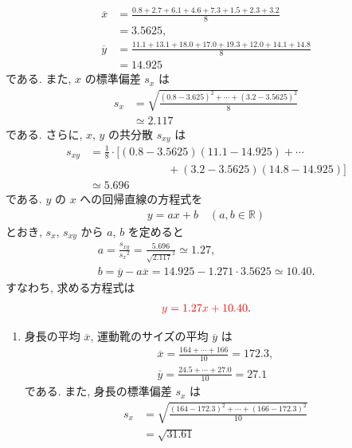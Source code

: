 \begin{qenumerate}
{\begin{align}
			\overline{x} &= \frac{0.8 + 2.7 + 6.1 + 4.6 + 7.3 + 1.5 + 2.3 + 3.2}{8} \\
				&= 3.5625, \\
			\overline{y} &= \frac{11.1 \! + \! 13.1 \! + \! 18.0 \! + \! 17.0 \! + \! 19.3 \! + \! 12.0 \! + \! 14.1 \! + \! 14.8}{8} \\
				&= 14.925
		\end{align}
		である.
		また, $x$ の標準偏差 $s_{x}$ は
		\begin{align}
			s_{x} &= \sqrt{\frac{(0.8 - 3.625)^{2} + \cdots + (3.2 - 3.5625)^{2}}{8}} \\
				&\simeq 2.117
		\end{align}
		である.
		さらに, $x$, $y$ の共分散 $s_{xy}$ は
		\begin{align}
			s_{xy} &= \frac{1}{8}\cdot [(0.8 - 3.5625)(11.1 - 14.925) + \cdots \\
				&\quad\quad\quad\quad\quad\quad\quad + (3.2 - 3.5625)(14.8 - 14.925)] \\
				&\simeq 5.696
		\end{align}
		である.
		$y$ の $x$ への回帰直線の方程式を
		\begin{align}
			y=ax + b\quad (a, b\in\mathbb{R})
		\end{align}
		とおき, $s_{x}$, $s_{xy}$ から $a$, $b$ を定めると
		\begin{gather}
			a = \frac{s_{xy}}{{s_{x}}^{2}} = \frac{5.696}{\sqrt{2.117}^{2}} \simeq 1.27, \\
			b = \overline{y} - a\overline{x} = 14.925 - 1.271\cdot 3.5625 \simeq 10.40.
		\end{gather}
		すなわち, 求める方程式は
		\begin{align}
			\textcolor{red}{y = 1.27x + 10.40}.
		\end{align}
	}
	\item{
		\begin{enumerate}
			\item{
				身長の平均 $\overline{x}$, 運動靴のサイズの平均 $\overline{y}$ は
				\begin{gather}
					\overline{x} = \frac{164 + \cdots + 166}{10} = 172.3, \\
					\overline{y} = \frac{24.5 + \cdots + 27.0}{10} = 27.1
				\end{gather}
				である.
				また, 身長の標準偏差 $s_{x}$ は
				\begin{align}
					s_{x} &= \sqrt{\frac{(164 - 172.3)^{2} + \cdots + (166 - 172.3)^{2}}{10}} \\
						&= \sqrt{31.61}
				\end{align}
}
\end{enumerate}}
\end{qenumerate}
